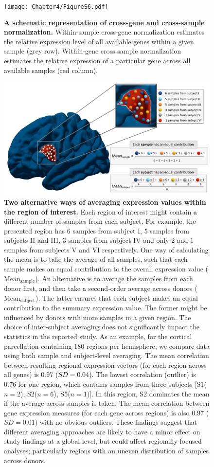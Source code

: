 \begin{figure}[h!]
  \centering
    \texttt{[image: Chapter4/FigureS6.pdf]}
\caption{\textbf{A schematic representation of cross-gene and cross-sample normalization.} Within-sample cross-gene normalization estimates the relative expression level of all available genes within a given sample (grey row). Within-gene cross sample normalization estimates the relative expression of a particular gene across all available samples (red column).}
\label{fig:Ch4Sfig6}
\end{figure}

\begin{figure}[h!]
  \centering
    \includegraphics[width=1\textwidth]{Chapter4/FigureS7.pdf}
\caption{\textbf{Two alternative ways of averaging expression values within the region of interest. }
Each region of interest might contain a different number of samples from each subject. For example, the presented region has $6$ samples from subject I, $5$ samples from subjects II and III, $3$ samples from subject IV and only $2$ and $1$ samples from subjects V and VI respectively. One way of calculating the mean is to take the average of all samples, such that each sample makes an equal contribution to the overall expression value ($\mathrm{Mean_{sample}}$). An alternative is to average the samples from each donor first, and then take a second-order average across donors ($\mathrm{Mean_{subject}}$). The latter ensures that each subject makes an equal contribution to the summary expression value. The former might be influenced by donors with more samples in a given region. The choice of inter-subject averaging does not significantly impact the statistics in the reported study. As an example, for the cortical parcellation containing 180 regions per hemisphere, we compare data using both sample and subject-level averaging. The mean correlation between resulting regional expression vectors (for each region across all genes) is $0.97$ ($SD = 0.04$). The lowest correlation (outlier) is $0.76$ for one region, which contains samples from three subjects [S1($n=2$), S2($n=6$), S5($n=1$)]. In this region, S2 dominates the mean if the average across samples is taken. The mean correlation between gene expression measures (for each gene across regions) is also $0.97$ ($SD = 0.01$) with no obvious outliers. These findings suggest that different averaging approaches are likely to have a minor effect on study findings at a global level, but could affect regionally-focused analyses; particularly regions with an uneven distribution of samples across donors.}

\end{figure}
